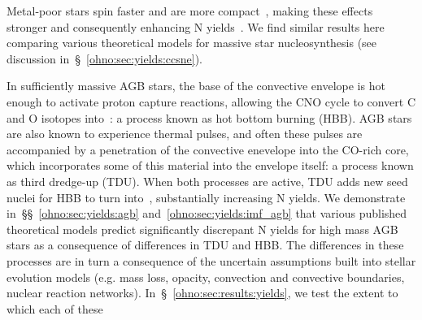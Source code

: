Metal-poor stars spin faster and are more compact~\citep*{Maeder1999}, making
these effects stronger and consequently enhancing N yields~\citep*{Meynet2002a,
Meynet2002b, Meynet2006}.
We find similar results here comparing various theoretical models for massive
star nucleosynthesis (see discussion in~\S~\ref{ohno:sec:yields:ccsne}).
\par
In sufficiently massive AGB stars, the base of the convective envelope is hot
enough to activate proton capture reactions, allowing the CNO cycle to convert
C and O isotopes into~\Nfourteen: a process known as hot bottom burning (HBB).
AGB stars are also known to experience thermal pulses,
and often these pulses
are accompanied by a penetration of the convective enevelope into the
CO-rich core, which incorporates some of this material into the envelope
itself: a process known as third dredge-up (TDU).
When both processes are active, TDU adds new seed nuclei for HBB to turn
into~\Nfourteen, substantially increasing N yields.
We demonstrate in~\S\S~\ref{ohno:sec:yields:agb} and~\ref{ohno:sec:yields:imf_agb} that
various published theoretical models predict significantly discrepant N yields
for high mass AGB stars as a consequence of differences in TDU and
HBB.
The differences in these processes are in turn a consequence of the uncertain
assumptions built into stellar evolution models (e.g. mass
loss, opacity, convection and convective boundaries, nuclear reaction
networks).
In~\S~\ref{ohno:sec:results:yields}, we test the extent to which each of these
